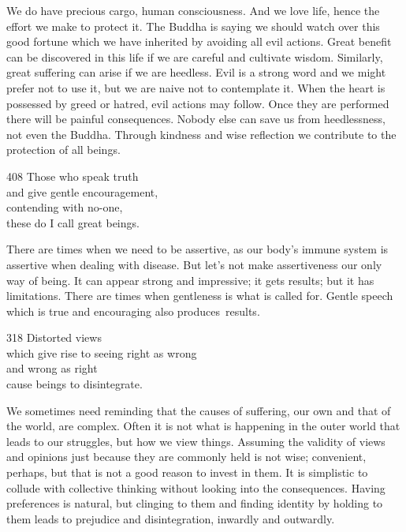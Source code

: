 \begin{dhpRefl}
  We do have precious cargo, human consciousness. And we love life, hence the
  effort we make to protect it. The Buddha is saying we should watch over this
  good fortune which we have inherited by avoiding all evil actions. Great
  benefit can be discovered in this life if we are careful and cultivate wisdom.
  Similarly, great suffering can arise if we are heedless. Evil is a strong word
  and we might prefer not to use it, but we are naive not to contemplate it.
  When the heart is possessed by greed or hatred, evil actions may follow. Once
  they are performed there will be painful consequences. Nobody else can save us
  from heedlessness, not even the Buddha. Through kindness and wise reflection
  we contribute to the protection of all beings.
\end{dhpRefl}


\begin{dhpVerse}{408}
\label{dhp-408}
Those who speak truth\\
and give gentle encouragement,\\
contending with no-one,\\
these do I call great beings.
\end{dhpVerse}

\begin{dhpRefl}
  There are times when we need to be assertive, as our body’s immune system is
  assertive when dealing with disease. But let’s not make \mbox{assertiveness} our only
  way of being. It can appear strong and impressive; it gets results; but it has
  limitations. There are times when gentleness is what is called for. Gentle
  speech which is true and encouraging also produces~results.
\end{dhpRefl}


\begin{dhpVerse}{318}
\label{dhp-318}
Distorted views\\
which give rise to seeing right as wrong\\
and wrong as right\\
cause beings to disintegrate.
\end{dhpVerse}

\begin{dhpRefl}
  We sometimes need reminding that the causes of suffering, our own and that of
  the world, are complex. Often it is not what is happening in the outer world
  that leads to our struggles, but how we view things. Assuming the validity of
  views and opinions just because they are commonly held is not wise;
  convenient, perhaps, but that is not a good reason to invest in them. It is
  simplistic to collude with collective thinking without looking into the
  consequences. Having preferences is natural, but clinging to them and finding
  identity by holding to them leads to prejudice and disintegration, inwardly
  and outwardly.
\end{dhpRefl}

